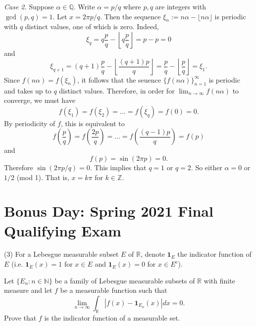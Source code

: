 \documentclass{exam}
\theoremstyle{problemstyle}
\newcommand{\1}[1]{\textbf{1}_{\left[#1\right]}} %
\def\limn{\lim_{n\to\infty}} %
\def\R{\mathbb{R}} %
\def\Z{\mathbb{Z}} %
\def\Q{\mathbb{Q}} %
\def\({\left (}
\def\){\right )}
\begin{document}
\begin{questions}
\begin{solution}
  \textit{Case 2.} Suppose $\alpha\in\Q$. Write $\alpha = p/q$ where $p,q$ are integers with $\gcd(p,q)=1$. Let $x = 2\pi p/q$. Then the sequence $\xi_{n}:= n\alpha-\lfloor n \alpha \rfloor$ is periodic with $q$ distinct values, one of which is zero. Indeed,
  \begin{equation*}
    \xi_{q}=q \frac{p}{q} - \left\lfloor q \frac{p}{q} \right\rfloor = p-p = 0
  \end{equation*}
  and
  \begin{equation*}
    \xi_{q+1}= (q+1)\frac{p}{q} - \left\lfloor \frac{(q+1)p}{q} \right\rfloor = \frac{p}{q} - \left\lfloor \frac{p}{q}\right\rfloor = \xi_{1}.
  \end{equation*}
  Since $f(n\alpha) = f(\xi_{n})$, it follows that the seuence $\{f(n\alpha)\}_{n=1}^{\infty}$ is periodic and takes up to $q$ distinct values. Therefore, in order for $\limn f(n\alpha)$ to converge, we must have
  \[ f(\xi_{1})=f(\xi_{2})=\ldots=f(\xi_{q})=f(0)=0. \]
  By periodicity of $f$, this is equivalent to
	\begin{equation*}
    f\(\frac{p}{q}\)= f\(\frac{2p}{q}\)=\ldots=f\left(\frac{(q-1)p}{q}\right)=f(p)
  \end{equation*}
  and
  \begin{equation*}
    f(p) = \sin(2\pi p)=0.
  \end{equation*}
  Therefore $\sin(2\pi p/q)=0$. This implies that $q=1$ or $q=2$. So either $\alpha =0$ or $1/2$ (mod 1). That is, $x=k\pi$ for $k\in \Z$.
\end{solution}


\newpage
\section{Bonus Day: Spring 2021 Final Qualifying Exam}

\question (3) For a Lebesgue measurable subset $E$ of $\R$, denote $\textbf{1}_E$ the indicator function of $E$ (i.e. $\textbf{1}_E(x)=1$ for $x\in E$ and $\textbf{1}_E(x) = 0$ for $x\in E^c$).

Let $\{E_n: n\in \mathbb{N}\}$ be a family of Lebesgue measurable subsets of $\R$ with finite measure and let $f$ be a measurable function such that \begin{equation*}
\limn \int_{\R} | f(x)-\textbf{1}_{E_n}(x)| dx = 0.
\end{equation*}
Prove that $f$ is the indicator function of a measurable set.


\end{questions}
\end{document}
